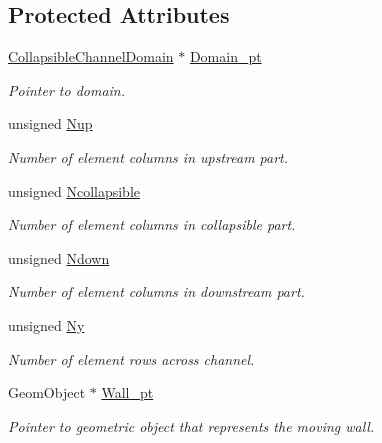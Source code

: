 \subsection*{Protected Attributes}
\begin{DoxyCompactItemize}
\item 
\hyperlink{classoomph_1_1CollapsibleChannelDomain}{Collapsible\+Channel\+Domain} $\ast$ \hyperlink{classoomph_1_1CollapsibleChannelMesh_ae7b9e4a110dded8399a6daf6f48a9e23}{Domain\+\_\+pt}
\begin{DoxyCompactList}\small\item\em Pointer to domain. \end{DoxyCompactList}\item 
unsigned \hyperlink{classoomph_1_1CollapsibleChannelMesh_aafd1c6d21bb891f1188ba6eed1705a45}{Nup}
\begin{DoxyCompactList}\small\item\em Number of element columns in upstream part. \end{DoxyCompactList}\item 
unsigned \hyperlink{classoomph_1_1CollapsibleChannelMesh_aa59ff7af47247b2e17b13c45f83fcf86}{Ncollapsible}
\begin{DoxyCompactList}\small\item\em Number of element columns in collapsible part. \end{DoxyCompactList}\item 
unsigned \hyperlink{classoomph_1_1CollapsibleChannelMesh_acd1b5ea7597a079b4321d3658f2e03f4}{Ndown}
\begin{DoxyCompactList}\small\item\em Number of element columns in downstream part. \end{DoxyCompactList}\item 
unsigned \hyperlink{classoomph_1_1CollapsibleChannelMesh_afa8d1dceef1cafeb166794d9275a30a3}{Ny}
\begin{DoxyCompactList}\small\item\em Number of element rows across channel. \end{DoxyCompactList}\item 
Geom\+Object $\ast$ \hyperlink{classoomph_1_1CollapsibleChannelMesh_a2457ac1492c962b0a3d962b13b51ea6e}{Wall\+\_\+pt}
\begin{DoxyCompactList}\small\item\em Pointer to geometric object that represents the moving wall. \end{DoxyCompactList}\end{DoxyCompactItemize}


